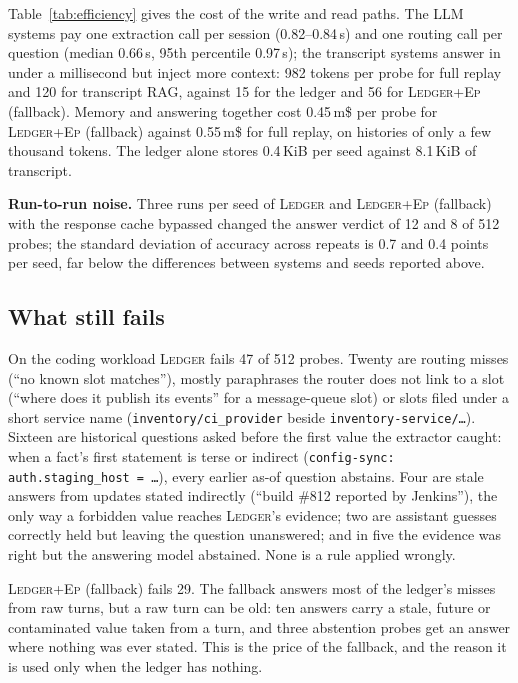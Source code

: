 \documentclass[10pt,conference]{IEEEtran}
\newcommand{\sys}{\textsc{Ledger}}
\newcommand{\hyb}{\textsc{Ledger+Ep}}
\begin{document}
Table~\ref{tab:efficiency} gives the cost of the write and read paths. The
LLM systems pay one extraction call per session (0.82--0.84\,s) and one
routing call per question (median 0.66\,s, 95th percentile 0.97\,s); the
transcript systems answer in under a millisecond but inject more context:
982 tokens per probe for full replay and 120 for transcript RAG, against 15
for the ledger and 56 for \hyb{} (fallback). Memory and answering together cost 0.45\,m\$ per probe for \hyb{}
(fallback) against 0.55\,m\$ for full replay, on histories of only a few
thousand tokens. The ledger alone stores 0.4\,KiB per seed against 8.1\,KiB of
transcript.

\textbf{Run-to-run noise.} Three runs per seed of \sys{} and \hyb{}
(fallback) with the response cache bypassed changed the answer verdict of
12 and 8 of 512 probes; the standard deviation of accuracy across repeats is
0.7 and 0.4 points per seed, far below the differences between systems and
seeds reported above.

\subsection{What still fails}

On the coding workload \sys{} fails 47 of 512 probes. Twenty are routing
misses (``no known slot matches''), mostly paraphrases the router does not
link to a slot (``where does it publish its events'' for a message-queue
slot) or slots filed under a short service name (\texttt{inventory/ci\_provider}
beside \texttt{inventory-service/\ldots}). Sixteen are historical questions
asked before the first value the extractor caught: when a fact's first
statement is terse or indirect (\texttt{config-sync: auth.staging\_host =
\ldots}), every earlier as-of question abstains. Four are stale answers from
updates stated indirectly (``build \#812 reported by Jenkins''), the only way
a forbidden value reaches \sys{}'s evidence; two are assistant guesses
correctly held but leaving the question unanswered; and in five the evidence
was right but the answering model abstained. None is a rule applied wrongly.

\hyb{} (fallback) fails 29. The fallback answers most of the ledger's misses
from raw turns, but a raw turn can be old: ten answers carry a stale, future
or contaminated value taken from a turn, and three abstention probes get an
answer where nothing was ever stated. This is the price of the fallback, and
the reason it is used only when the ledger has nothing.
\end{document}
